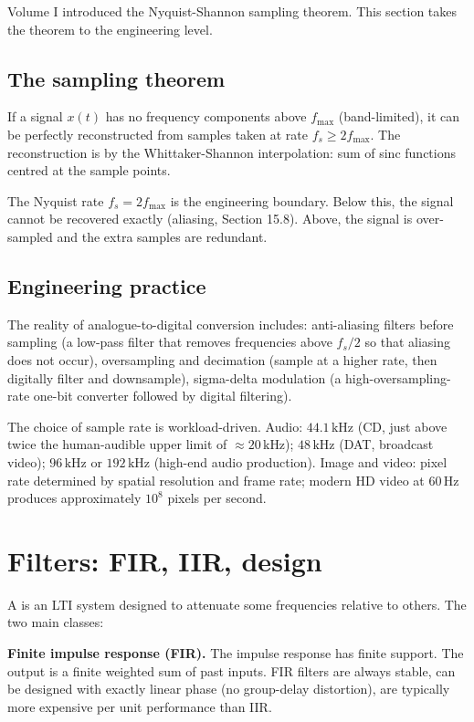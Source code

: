 Volume I introduced the Nyquist-Shannon sampling theorem. This section takes the theorem to the engineering level.

\subsection{The sampling theorem}

If a signal $x(t)$ has no frequency components above $f_{\max}$ (band-limited), it can be perfectly reconstructed from samples taken at rate $f_s \geq 2 f_{\max}$. The reconstruction is by the Whittaker-Shannon interpolation: sum of sinc functions centred at the sample points.

The Nyquist rate $f_s = 2 f_{\max}$ is the engineering boundary. Below this, the signal cannot be recovered exactly (aliasing, Section 15.8). Above, the signal is over-sampled and the extra samples are redundant.

\subsection{Engineering practice}

The reality of analogue-to-digital conversion includes: anti-aliasing filters before sampling (a low-pass filter that removes frequencies above $f_s / 2$ so that aliasing does not occur), oversampling and decimation (sample at a higher rate, then digitally filter and downsample), sigma-delta modulation (a high-oversampling-rate one-bit converter followed by digital filtering).

The choice of sample rate is workload-driven. Audio: $44.1\,\si{\kilo\hertz}$ (CD, just above twice the human-audible upper limit of $\approx 20\,\si{\kilo\hertz}$); $48\,\si{\kilo\hertz}$ (DAT, broadcast video); $96\,\si{\kilo\hertz}$ or $192\,\si{\kilo\hertz}$ (high-end audio production). Image and video: pixel rate determined by spatial resolution and frame rate; modern HD video at $60\,\text{Hz}$ produces approximately $10^8$ pixels per second.

\section{Filters: FIR, IIR, design}

A  is an LTI system designed to attenuate some frequencies relative to others. The two main classes:

\textbf{Finite impulse response (FIR).} The impulse response has finite support. The output is a finite weighted sum of past inputs. FIR filters are always stable, can be designed with exactly linear phase (no group-delay distortion), are typically more expensive per unit performance than IIR.

